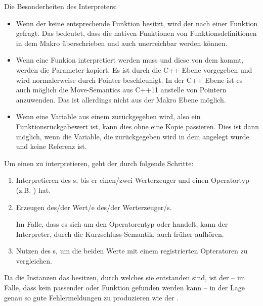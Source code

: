       Die Besonderheiten des Interpreters:
      \begin{itemize}
        \item Wenn der  keine entsprechende Funktion besitzt, wird der  nach einer Funktion gefragt. Das bedeutet, dass die nativen Funktionen von Funktionsdefinitionen in dem Makro überschrieben und auch unerreichbar werden können.
        \item Wenn eine Funkion interpretiert werden muss und diese von dem  kommt, werden die Parameter kopiert. Es ist durch die C++ Ebene vorgegeben und wird normalerweise durch Pointer beschleunigt. In der C++ Ebene ist es auch möglich die Move-Semantics\autocite[S.268 ff.]{C++14-std} aus C++11 anstelle von Pointern anzuwenden. Das ist allerdings nicht aus der Makro Ebene möglich.
        \item Wenn eine Variable aus einem  zurückgegeben wird, also ein Funktionsrückgabewert ist, kann dies ohne eine Kopie passieren. Dies ist dann möglich, wenn die Variable, die zurückgegeben wird in dem  angelegt wurde und keine Referenz ist.
      \end{itemize}

      Um einen  zu interpretieren, geht der  durch folgende Schritte:
      \begin{enumerate}
        \item Interpretieren des s, bis er einen/zwei Werterzeuger und einen Operatortyp (z.B. \myMinin{==}) hat.
        \item Erzeugen des/der Wert/e des/der Werterzeuger/s.

          Im Falle, dass es sich um den Operatorentyp \myMinin{&&} oder \myMinin{||} handelt, kann der Interpreter, durch die Kurzschluss-Semantik, auch früher aufhören.
        \item Nutzen des s, um die beiden Werte mit einem registrierten Opteratoren zu vergleichen.
      \end{enumerate}

      Da die  Instanzen das  besitzen, durch welches sie entstanden sind, ist der  -- im Falle, dass kein passender  oder Funktion gefunden werden kann -- in der Lage genau so gute Fehlermeldungen zu produzieren wie der .

